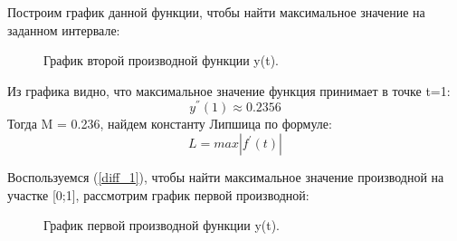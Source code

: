 \documentclass[12pt,a4paper]{article}
\begin{document}
Построим график данной функции, чтобы найти максимальное значение на заданном интервале:
\begin{figure}[h]
	\caption{График второй производной функции y(t).}
	\label{fig:image}
\end{figure}

Из графика видно, что максимальное значение функция принимает в точке t=1:
\begin{equation}
	y^{''}(1) \approx 0.2356
\end{equation}
Тогда M = 0.236, найдем константу Липшица по формуле:
\begin{equation}
	L = max|f^{'}(t)|	
\end{equation}


Воспользуемся (\ref{diff_1}), чтобы найти максимальное значение производной на участке [0;1], рассмотрим график первой производной:
\begin{figure}[h]
	\caption{График первой производной функции y(t).}
	\label{fig:image}
\end{figure}
\end{document}

